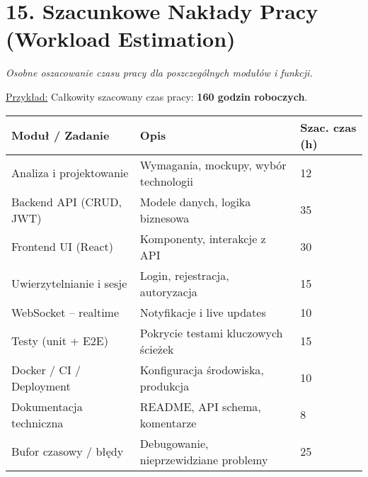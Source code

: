 \documentclass[a4paper,12pt]{article}
\begin{document}
\section*{15. Szacunkowe Nakłady Pracy (Workload Estimation)}
\textit{Osobne oszacowanie czasu pracy dla poszczególnych modułów i funkcji.}

\vspace{0.5 cm}
 \noindent
\underline{Przykład:} 
\vspace{0.5 cm}
 \noindent
Całkowity szacowany czas pracy: \textbf{160 godzin roboczych}.

\begin{longtable}{|p{6cm}|p{4cm}|p{3cm}|}
\hline
\textbf{Moduł / Zadanie} & \textbf{Opis} & \textbf{Szac. czas (h)} \\
\hline
Analiza i projektowanie & Wymagania, mockupy, wybór technologii & 12 \\
\hline
Backend API (CRUD, JWT) & Modele danych, logika biznesowa & 35 \\
\hline
Frontend UI (React) & Komponenty, interakcje z API & 30 \\
\hline
Uwierzytelnianie i sesje & Login, rejestracja, autoryzacja & 15 \\
\hline
WebSocket – realtime & Notyfikacje i live updates & 10 \\
\hline
Testy (unit + E2E) & Pokrycie testami kluczowych ścieżek & 15 \\
\hline
Docker / CI / Deployment & Konfiguracja środowiska, produkcja & 10 \\
\hline
Dokumentacja techniczna & README, API schema, komentarze & 8 \\
\hline
Bufor czasowy / błędy & Debugowanie, nieprzewidziane problemy & 25 \\
\hline
\end{longtable}
\end{document}

